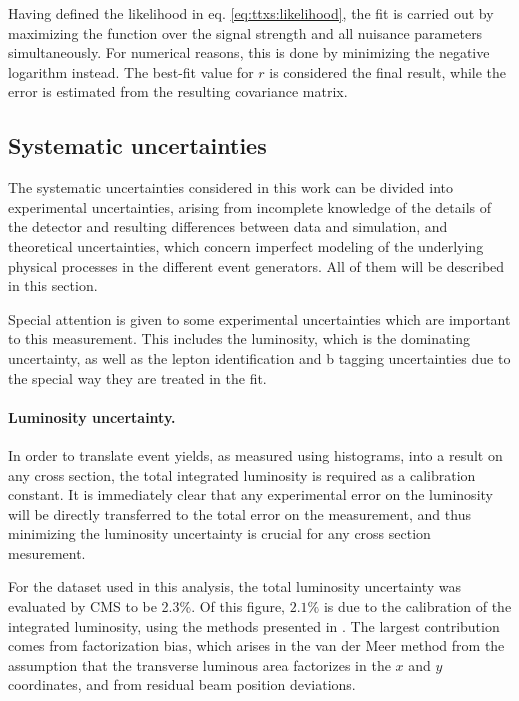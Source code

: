 Having defined the likelihood in eq. \ref{eq:ttxs:likelihood}, the fit is carried out by maximizing the function over the signal strength and all nuisance parameters simultaneously. For numerical reasons, this is done by minimizing the negative logarithm instead. The best-fit value for $r$ is considered the final result, while the error is estimated from the resulting covariance matrix. 

\subsection{Systematic uncertainties}
\label{sec:ttxs:systematics}


The systematic uncertainties considered in this work can be divided into experimental uncertainties, arising from incomplete knowledge of the details of the detector and resulting differences between data and simulation, and theoretical uncertainties, which concern imperfect modeling of the underlying physical processes in the different event generators. All of them will be described in this section.

Special attention is given to some experimental uncertainties which are important to this measurement. This includes the luminosity, which is the dominating uncertainty, as well as the lepton identification and b tagging uncertainties due to the special way they are treated in the fit.

\paragraph{Luminosity uncertainty.}

In order to translate event yields, as measured using histograms, into a result on any cross section, the total integrated luminosity is required as a calibration constant. It is immediately clear that any experimental error on the luminosity will be directly transferred to the total error on the measurement, and thus minimizing the luminosity uncertainty is crucial for any cross section mesurement.

For the dataset used in this analysis, the total luminosity uncertainty was evaluated by CMS to be 2.3\%. Of this figure, $2.1 \%$ is due to the calibration of the integrated luminosity, using the methods presented in . The largest contribution comes from factorization bias, which arises in the van der Meer method from the assumption that the transverse luminous area factorizes in the $x$ and $y$ coordinates, and from residual beam position deviations.

